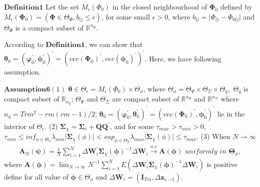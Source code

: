 \documentclass[12pt,a4paper,hyperref]{article}
\begin{document}
$\boldsymbol{Definition 1}$ Let the set $M_{\epsilon}(\Phi_{0})$ in the closed neighbourhood of $\boldsymbol{\Phi}_{0}$ defined by
$M_{\epsilon}(\boldsymbol{\Phi}_{0})=\left(\boldsymbol{\Phi}\in \Theta_{\Phi}, b_{lj}\leq \epsilon  \right)$, for some small $\epsilon > 0$, where $ b_{lj}=\vert \Phi_{lj}-\Phi_{0lj}  \vert $ and $\Theta_{\Phi}$ is a compact subset of $\mathbb{R}^{n_{\Phi}}$.

According to $\boldsymbol{Definition 1}$, we can show that $\boldsymbol{\theta}_{0}=(\boldsymbol{\varphi}^{'}_{0}, \boldsymbol{\phi}^{'}_{0})^{'}=( vec(\boldsymbol{\Phi}_{0})^{'}, vec(\boldsymbol{\phi}_{0})^{'}  )^{'}$. Here, we have following assumption.

$\boldsymbol{Assumption 6} (1)$ $\boldsymbol{\theta} \in \Theta_{\epsilon}=M_{\epsilon}(\Phi_{0})  \times \Theta_{\phi}$, where $\Theta_{\phi}=\Theta_{\Psi} \times \Theta_{\Sigma} \times \Theta_{q},$  $\Theta_{q}$ is compact subset of $\mathbb{R}_{n_{q}}$; $\Theta_{\Psi}$ and $\Theta_{\Sigma}$ are compact subset of $\mathbb{R}^{n_{\Psi}}$ and $\mathbb{R}^{n_{\Sigma}} $ where  $n_{q}=Trm^{2}-rm(rm-1)/2$; $\boldsymbol{\theta}_{0}=(\boldsymbol{\varphi}^{'}_{0}, \boldsymbol{\theta}^{'}_{0})^{'}=( vec(\boldsymbol{\Phi}_{0})^{'}, \boldsymbol{\phi}^{'}_{0} )^{'}  $ lie in the interior of $\Theta_{\epsilon}$. (2) $\boldsymbol{\Sigma}_{\chi}=\boldsymbol{\Sigma}_{e}+\boldsymbol{QQ}^{'}$, and for some $\tau_{max}> \tau_{min}>0$, $\tau_{min}  \leq inf_{\phi \in \Theta_{\phi}}\lambda_{min} \vert \boldsymbol{\Sigma}_{\chi}(\phi) \vert< sup_{\phi \in \Theta_{\phi}} \lambda_{max} \vert \boldsymbol{\Sigma}_{\chi}(\phi) \vert \leq \tau_{max}$.
(3) When $N \longrightarrow \infty$
\begin{align}
\boldsymbol{A}_{N}(\boldsymbol{\psi})=\frac{1}{N}\sum^{N}_{i=1} \Delta \boldsymbol{W}^{'}_{i}\boldsymbol{\Sigma}_{\chi}(\boldsymbol{\phi})^{-1} \Delta \boldsymbol{W}_{i}\overset{a.s}{\to} \boldsymbol{A}(\boldsymbol{\phi}) \,\, uniformly \,\, in \,\, \boldsymbol{\Theta}_{\phi},
\end{align}
where $\boldsymbol{A}(\boldsymbol{\phi})=\lim_{N\to\infty} N^{-1} \sum^{N}_{i=1}E(\Delta \boldsymbol{W}^{'}_{i}\boldsymbol{\Sigma}_{\chi}(\boldsymbol{\phi})^{-1} \Delta \boldsymbol{W}_{i} )$ is positive define for all value of $\boldsymbol{\phi} \in \Theta_{\phi}$ and $\Delta \boldsymbol{W}_{i}=(\boldsymbol{I}_{Tm}, \Delta \boldsymbol{z}_{i,-1})$.
\end{document}
